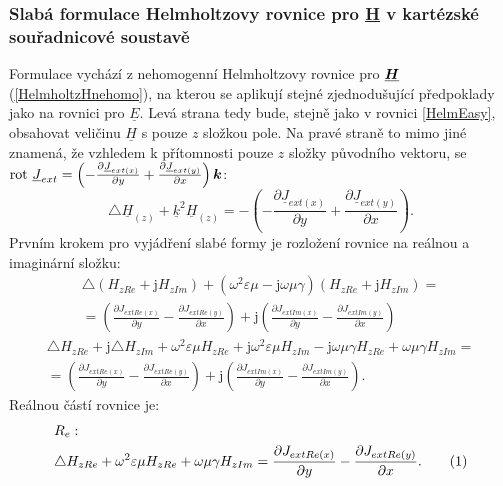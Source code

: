 \documentclass[12pt,a4paper,oneside]{article}
\numberwithin{equation}{section} %
\numberwithin{figure}{section} %
\numberwithin{table}{section} %
\newcommand{\mj}{\mathrm{j}} %
\renewcommand{\vec}[1]{\mbox{\boldmath$#1$}} %
\newcommand{\faz}[1]{{\underline{#1}}} %
\newcommand{\rot}{\mathrm{rot}\ }
\newcommand\numberthis{\addtocounter{equation}{1}\tag{\theequation}}
\begin{document}
\subsubsection{Slabá formulace Helmholtzovy rovnice pro \faz{H} v kartézské souřadnicové soustavě}
Formulace vychází z nehomogenní Helmholtzovy rovnice pro $\faz{\vec{H}}$ (\ref{HelmholtzHnehomo}), na kterou se aplikují stejné zjednodušující předpoklady jako na rovnici pro $\faz{E}$. Levá strana tedy bude, stejně jako v rovnici \ref{HelmEasy}, obsahovat veličinu $\faz{H}$ s pouze $z$ složkou pole. Na pravé straně to mimo jiné znamená, že vzhledem k přítomnosti pouze $z$ složky původního vektoru, se $\rot \faz{J} _{ext} = \left( - \frac{\partial \faz{J} _{ext(x)}}{\partial y} + \frac{\partial \faz{J} _{ext(y)}}{\partial x} \right) \vec{k}$:
\begin{equation}
\label{HelmEasyH}
\triangle \faz{H} _{(z)} + \faz{k} ^2 \faz{H} _{(z)} = - \left( - \frac{\partial \faz{J} _{ext(x)}}{\partial y} + \frac{\partial \faz{J} _{ext(y)}}{\partial x} \right) .
\end{equation}
Prvním krokem pro vyjádření slabé formy je rozložení rovnice na reálnou a imaginární složku:
\begin{equation}
\begin{split}
\triangle (H _{zRe} + \mj H _{zIm}) + (\omega ^2 \varepsilon \mu - \mj \omega \mu \gamma) (H _{zRe} + \mj H _{zIm}) =\\ 
= \left( \frac{\partial J _{extRe(x)}}{\partial y} - \frac{\partial J _{extRe(y)}}{\partial x} \right) + \mj \left( \frac{\partial J _{extIm(x)}}{\partial y} - \frac{\partial J _{extIm(y)}}{\partial x} \right)
\end{split}
\end{equation}
\begin{equation}
\begin{split}
\triangle H _{zRe} + \mj \triangle H _{zIm} + \omega ^2 \varepsilon \mu H_ {zRe} + \mj \omega ^2 \varepsilon \mu H _{zIm} - \mj \omega \mu \gamma H _{zRe} + \omega \mu \gamma H _{zIm} =\\
= \left( \frac{\partial J _{extRe(x)}}{\partial y} - \frac{\partial J _{extRe(y)}}{\partial x} \right) + \mj \left( \frac{\partial J _{extIm(x)}}{\partial y} - \frac{\partial J _{extIm(y)}}{\partial x} \right) .
\end{split}
\end{equation}
Reálnou částí rovnice je:
\begin{align*}
&R_{e}:
\\
&\triangle H_ {zRe} + \omega ^2 \varepsilon \mu H_ {zRe} + \omega \mu \gamma H _{zIm} = \frac{\partial J _{extRe(x)}}{\partial y} - \frac{\partial J _{extRe(y)}}{\partial x} .
\numberthis
\end{align*}
\end{document}
